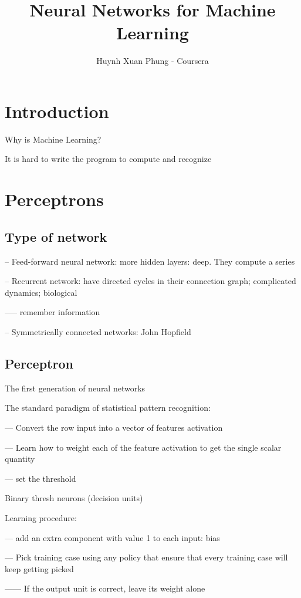 \documentclass{book}
\title{Neural Networks for Machine Learning}
\author{Huynh Xuan Phung - Coursera}
\date{ }
\begin{document}
 
\maketitle
 
\tableofcontents

\chapter{Introduction}

Why is Machine Learning?

It is hard to write the program to compute and recognize

\chapter{Perceptrons}

\section{Type of network}

-- Feed-forward neural network: more hidden layers: deep. They compute a series

-- Recurrent network: have directed cycles in their connection graph; complicated dynamics; biological

----- remember information

-- Symmetrically connected networks: John Hopfield
\section{Perceptron}

The first generation of neural networks

The standard paradigm of statistical pattern recognition:

--- Convert the row input into a vector of features activation

--- Learn how to weight each of the feature activation to get the single scalar quantity

--- set the threshold

Binary thresh neurons (decision units)

Learning procedure:

--- add an extra component with value 1 to each input: bias

--- Pick training case using any policy that ensure that every training case will keep getting picked

------ If the output unit is correct, leave its weight alone
\end{document}

